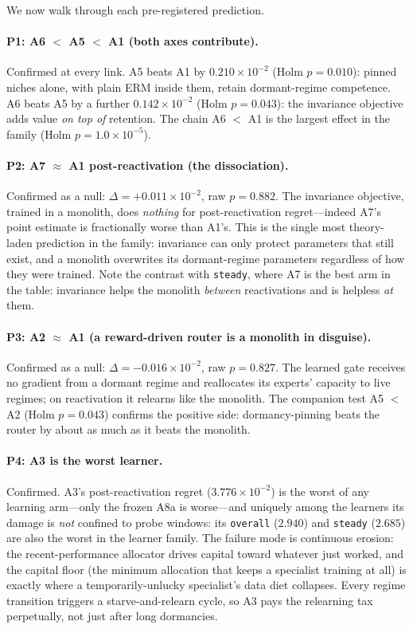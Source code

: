 We now walk through each pre-registered prediction.

\paragraph{P1: A6 $<$ A5 $<$ A1 (both axes contribute).}
Confirmed at every link. A5 beats A1 by $0.210 \times 10^{-2}$
(Holm $p = 0.010$): pinned niches alone, with plain ERM inside them, retain
dormant-regime competence. A6 beats A5 by a further $0.142 \times 10^{-2}$
(Holm $p = 0.043$): the invariance objective adds value \emph{on top of}
retention. The chain A6 $<$ A1 is the largest effect in the family
(Holm $p = 1.0 \times 10^{-5}$).

\paragraph{P2: A7 $\approx$ A1 post-reactivation (the dissociation).}
Confirmed as a null: $\Delta = +0.011 \times 10^{-2}$, raw $p = 0.882$. The
invariance objective, trained in a monolith, does \emph{nothing} for
post-reactivation regret---indeed A7's point estimate is fractionally worse
than A1's. This is the single most theory-laden prediction in the family:
invariance can only protect parameters that still exist, and a monolith
overwrites its dormant-regime parameters regardless of how they were
trained. Note the contrast with \texttt{steady}, where A7 is the best arm in
the table: invariance helps the monolith \emph{between} reactivations and is
helpless \emph{at} them.

\paragraph{P3: A2 $\approx$ A1 (a reward-driven router is a monolith in
disguise).}
Confirmed as a null: $\Delta = -0.016 \times 10^{-2}$, raw $p = 0.827$. The
learned gate receives no gradient from a dormant regime and reallocates its
experts' capacity to live regimes; on reactivation it relearns like the
monolith. The companion test A5 $<$ A2 (Holm $p = 0.043$) confirms the
positive side: dormancy-pinning beats the router by about as much as it
beats the monolith.

\paragraph{P4: A3 is the worst learner.}
Confirmed. A3's post-reactivation regret ($3.776 \times 10^{-2}$) is the
worst of any learning arm---only the frozen A8a is worse---and uniquely
among the learners its damage is \emph{not} confined to probe windows: its
\texttt{overall} ($2.940$) and \texttt{steady} ($2.685$) are also the worst
in the learner family. The failure mode is continuous erosion: the
recent-performance allocator drives capital toward whatever just worked,
and the capital floor (the minimum allocation that keeps a specialist
training at all) is exactly where a temporarily-unlucky specialist's data
diet collapses. Every regime transition triggers a starve-and-relearn cycle,
so A3 pays the relearning tax perpetually, not just after long dormancies.

